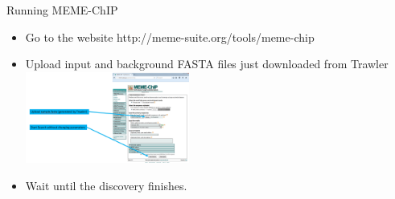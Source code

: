 \begin{steps}
Running MEME-ChIP
\begin{itemize}
	\item Go to the website http://meme-suite.org/tools/meme-chip  
	\item Upload input and background FASTA files just downloaded from Trawler
		\includegraphics[height=3cm]{MEME1.PNG}
	\item Wait until the discovery finishes. 
\end{itemize}
\end{steps}



